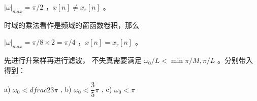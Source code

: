 \documentclass[lang=cn,11pt,a4paper,cite=authoryear,twocolumn]{elegantpaper}
\begin{document}
\(|\omega|_{max} = \pi/2\) ，\(x[n] \neq x_r[n]\) 。


时域的乘法看作是频域的窗函数卷积，那么

\(|\omega|_{max} = \pi/8 \times 2 = \pi/4\) ，\(x[n] = x_r[n]\) 。


先进行升采样再进行滤波， 不失真需要满足 \(\omega_0 / L < \min{\pi/M, \pi/L}\) 。分别带入得到：

a) \(\omega_0 < dfrac{2}{3} \pi\) , b) \(\omega_0 < \dfrac{3}{5} \pi\) , c) \(\omega_0 < \pi \)



\end{document}
